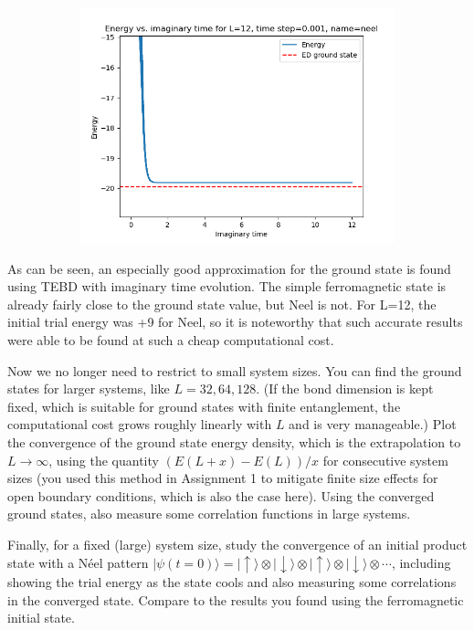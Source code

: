 \documentclass[12pt]{article}
\begin{document}
\begin{figure}
\begin{subfigure}{.5\textwidth}
  \includegraphics[width=\linewidth]{p4_1_energy_L_12time_step_0.001name_neel.png}
  \label{fig:2c}
\end{subfigure}
\end{figure}
As can be seen, an especially good approximation for the ground state is found using TEBD with imaginary time evolution. The simple ferromagnetic state is already fairly close to the ground state value, but Neel is not. For L=12, the initial trial energy was +9 for Neel, so it is noteworthy that such accurate results were able to be found at such a cheap computational cost.
\newpage

Now we no longer need to restrict to small system sizes. You can find the ground states for larger systems, like $L=32,64,128$. (If the bond dimension is kept fixed, which is suitable for ground states with finite entanglement, the computational cost grows roughly linearly with $L$ and is very manageable.) Plot the convergence of the ground state energy density, which is the extrapolation to $L \rightarrow \infty$, using the quantity $(E(L+x)-E(L)) / x$ for consecutive system sizes (you used this method in Assignment 1 to mitigate finite size effects for open boundary conditions, which is also the case here). Using the converged ground states, also measure some correlation functions in large systems.

Finally, for a fixed (large) system size, study the convergence of an initial product state with a Néel pattern $|\psi(t=0)\rangle=|\uparrow\rangle \otimes|\downarrow\rangle \otimes|\uparrow\rangle \otimes|\downarrow\rangle \otimes \cdots$, including showing the trial energy as the state cools and also measuring some correlations in the converged state. Compare to the results you found using the ferromagnetic initial state.
\end{document}
